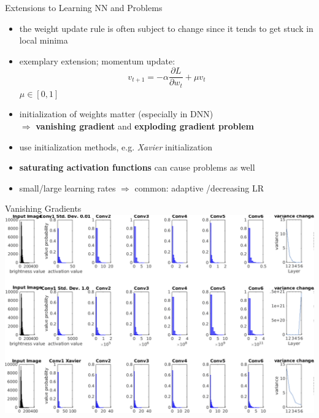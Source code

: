 \documentclass{beamer}
\begin{document}
\begin{frame}{Extensions to Learning NN and Problems}

\begin{itemize}
\item the weight update rule is often subject to change since it tends to get stuck in local minima
\item exemplary extension; momentum update:
\begin{equation}
v_{t+1} = - \alpha \frac{\partial L}{\partial w_t} + \mu v_t
\end{equation} $\mu \in [0,1]$

\item initialization of weights matter (especially in DNN)\\
$\Rightarrow$ \textbf{vanishing gradient} and \textbf{exploding gradient problem}
\item use initialization methods, e.g. \emph{Xavier} initialization
\item \textbf{saturating activation functions} can cause problems as well
\item small/large learning rates $\Rightarrow$ common: adaptive /decreasing LR
\end{itemize}
\end{frame}

\begin{frame}{Vanishing Gradients}
\includegraphics[width=1\textwidth]{vanishing}
\end{frame}
\end{document}
